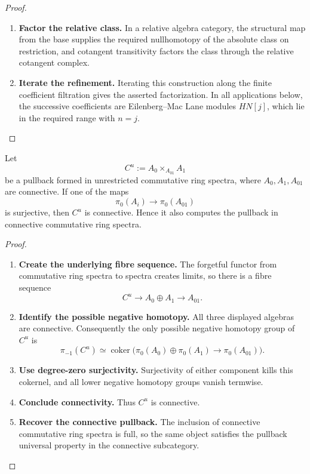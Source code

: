 \begin{proof}
\begin{enumerate}[label=\textup{(\arabic*)}]
    The
    small-extension recognition theorem therefore identifies it with a structured
    square-zero extension by \(M'\).
    \item \textbf{Factor the relative class.}
    In a relative algebra category, the
    structural map from the base supplies the required nullhomotopy of the
    absolute class on restriction, and cotangent transitivity factors the class
    through the relative cotangent complex.
    \item \textbf{Iterate the refinement.}
    Iterating this construction along the finite coefficient filtration gives the
    asserted factorization. In all applications below, the successive coefficients
    are Eilenberg--Mac Lane modules \(HN[j]\), which lie in the required range
    with \(n=j\).
\end{enumerate}
\end{proof}


\begin{lemma}
\label{lem:connective-nilpotent-pullback}
Let
\[
    C^u:=A_0\times_{A_{01}}A_1
\]
be a pullback formed in unrestricted commutative ring spectra, where
\(A_0,A_1,A_{01}\) are connective. If one of the maps
\[
    \pi_0(A_i)\longrightarrow\pi_0(A_{01})
\]
is surjective, then \(C^u\) is connective. Hence it also computes the pullback
in connective commutative ring spectra.
\end{lemma}

\begin{proof}
\leavevmode
\begin{enumerate}[label=\textup{(\arabic*)}]
    \item \textbf{Create the underlying fibre sequence.}
    The forgetful functor from commutative ring spectra to spectra creates limits,
    so there is a fibre sequence
    \[
        C^u
        \longrightarrow
        A_0\oplus A_1
        \longrightarrow
        A_{01}.
    \]
    \item \textbf{Identify the possible negative homotopy.}
    All three displayed algebras are connective. Consequently the only possible
    negative homotopy group of \(C^u\) is
    \[
        \pi_{-1}(C^u)
        \simeq
        \operatorname{coker}
        \bigl(
            \pi_0(A_0)\oplus\pi_0(A_1)
            \longrightarrow
            \pi_0(A_{01})
        \bigr).
    \]
    \item \textbf{Use degree-zero surjectivity.}
    Surjectivity of either component kills this cokernel, and all lower negative
    homotopy groups vanish termwise.
    \item \textbf{Conclude connectivity.}
    Thus \(C^u\) is connective.
    \item \textbf{Recover the connective pullback.}
    The inclusion of
    connective commutative ring spectra is full, so the same object satisfies the
    pullback universal property in the connective subcategory.
\end{enumerate}
\end{proof}

